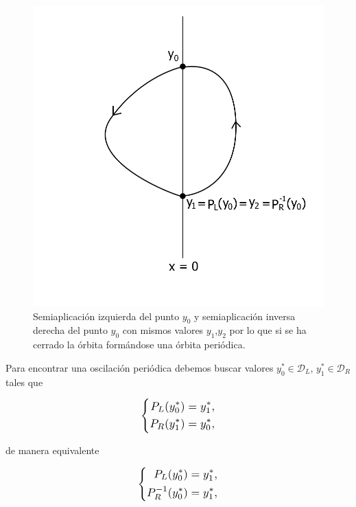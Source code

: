 \documentclass[12pt,a4paper]{report} %
\begin{document}
	\begin{figure}[h]
		\centering
		\includegraphics[width=1\textwidth]{aplipoincareL-Rcerrado.jpg}
		\caption{Semiaplicación izquierda del punto $y_0$ y semiaplicación inversa derecha del punto $y_0$ con mismos valores $y_1$,$y_2$ por lo que si se ha cerrado la órbita formándose una órbita periódica.}
		\label{fig:aplipoincareL-Rcerrado}
	\end{figure}\smallskip
	
	\newpage
	
	\vspace{0.5cm}\noindent Para encontrar una oscilación periódica debemos buscar valores $y_0^*\in \mathcal{D}_L$, $y_1^*\in \mathcal{D}_R$ tales que
	
	\begin{equation*}
		\label{eq:ej1}
		\scalebox{1.2}{$\displaystyle
			\left\{
			\begin{aligned}
				P_L(y_0^*)=y_1^*, \\
				P_R(y_1^*)=y_0^* ,
			\end{aligned}
			\right. 
			$}
	\end{equation*}\smallskip
	
	\noindent de manera equivalente
	
	\begin{equation*}
		\label{eq:ej2}
		\scalebox{1.2}{$\displaystyle
			\left\{
			\begin{aligned}
				P_L(y_0^*)=y_1^*, \\
				P_R^{-1}(y_0^*)=y_1^*,
			\end{aligned}
			\right. 
			$}
	\end{equation*}\smallskip
	
\end{document}
